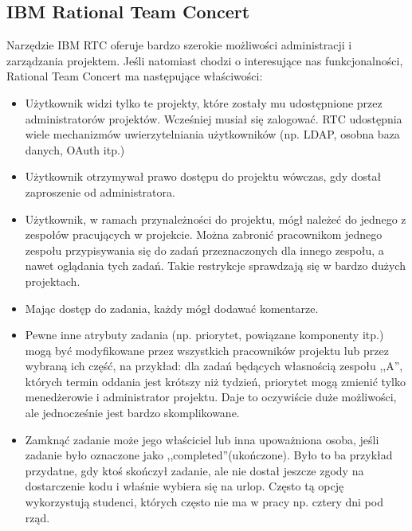 \documentclass[a4paper,12pt,notitlepage]{mwrep}
\begin{document}
\subsection{IBM Rational Team Concert}
Narzędzie IBM RTC oferuje bardzo szerokie możliwości administracji i zarządzania projektem. Jeśli natomiast chodzi o interesujące nas funkcjonalności, Rational Team Concert ma następujące właściwości:
\begin{itemize}
	\item	Użytkownik widzi tylko te projekty, które zostały mu udostępnione przez administratorów projektów. Wcześniej musiał się zalogować. RTC udostępnia wiele mechanizmów uwierzytelniania użytkowników (np. LDAP, osobna baza danych, OAuth itp.)
	\item	Użytkownik otrzymywał prawo dostępu do projektu wówczas, gdy dostał zaproszenie od administratora.
	\item	Użytkownik, w ramach przynależności do projektu, mógł należeć do jednego z zespołów pracujących w projekcie. Można zabronić pracownikom jednego zespołu przypisywania się do zadań przeznaczonych dla innego zespołu, a nawet oglądania tych zadań. Takie restrykcje sprawdzają się w bardzo dużych projektach.
	\item	Mając dostęp do zadania, każdy mógł dodawać komentarze.
	\item	Pewne inne atrybuty zadania (np. priorytet, powiązane komponenty itp.) mogą być modyfikowane przez wszystkich pracowników projektu lub przez wybraną ich część, na przykład: dla zadań będących własnością zespołu ,,A'', których termin oddania jest krótszy niż tydzień, priorytet mogą zmienić tylko menedżerowie i administrator projektu. Daje to oczywiście duże możliwości, ale jednocześnie jest bardzo skomplikowane.
	\item	Zamknąć zadanie może jego właściciel lub inna upoważniona osoba, jeśli zadanie było oznaczone jako ,,completed''(ukończone). Było to ba przykład przydatne, gdy ktoś skończył zadanie, ale nie dostał jeszcze zgody na dostarczenie kodu i właśnie wybiera się na urlop. Często tą opcję wykorzystują studenci, których często nie ma w pracy np. cztery dni pod rząd.
\end{itemize}
\end{document}
